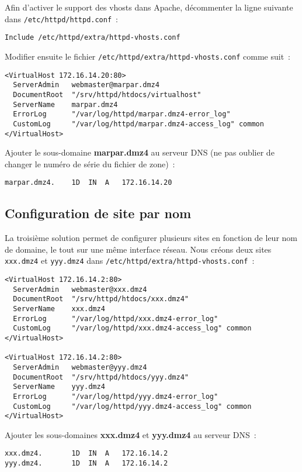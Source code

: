 \documentclass[11pt,a4paper,oneside]{article}
\newcommand{\inlinecode}{\lstinline[breaklines=true]}
\begin{document}
Afin d'activer le support des vhosts dans Apache, décommenter la ligne suivante
dans \inlinecode{/etc/httpd/httpd.conf}~:
\begin{lstlisting}
Include /etc/httpd/extra/httpd-vhosts.conf
\end{lstlisting}

Modifier ensuite le fichier \inlinecode{/etc/httpd/extra/httpd-vhosts.conf} comme
suit~:
\begin{lstlisting}
<VirtualHost 172.16.14.20:80>
  ServerAdmin   webmaster@marpar.dmz4
  DocumentRoot  "/srv/httpd/htdocs/virtualhost"
  ServerName    marpar.dmz4
  ErrorLog      "/var/log/httpd/marpar.dmz4-error_log"
  CustomLog     "/var/log/httpd/marpar.dmz4-access_log" common
</VirtualHost>
\end{lstlisting}

Ajouter le sous-domaine \textbf{marpar.dmz4} au serveur DNS (ne pas oublier de
changer le numéro de série du fichier de zone)~:
\begin{lstlisting}
marpar.dmz4.    1D  IN  A   172.16.14.20
\end{lstlisting}

\subsection{Configuration de site par nom}

La troisième solution permet de configurer plusieurs sites en fonction de leur
nom de domaine, le tout sur une même interface réseau. Nous créons deux sites
\inlinecode{xxx.dmz4} et \inlinecode{yyy.dmz4} dans
\inlinecode{/etc/httpd/extra/httpd-vhosts.conf}~:
\begin{lstlisting}
<VirtualHost 172.16.14.2:80>
  ServerAdmin   webmaster@xxx.dmz4
  DocumentRoot  "/srv/httpd/htdocs/xxx.dmz4"
  ServerName    xxx.dmz4
  ErrorLog      "/var/log/httpd/xxx.dmz4-error_log"
  CustomLog     "/var/log/httpd/xxx.dmz4-access_log" common
</VirtualHost>

<VirtualHost 172.16.14.2:80>
  ServerAdmin   webmaster@yyy.dmz4
  DocumentRoot  "/srv/httpd/htdocs/yyy.dmz4"
  ServerName    yyy.dmz4
  ErrorLog      "/var/log/httpd/yyy.dmz4-error_log"
  CustomLog     "/var/log/httpd/yyy.dmz4-access_log" common
</VirtualHost>
\end{lstlisting}

Ajouter les sous-domaines \textbf{xxx.dmz4} et \textbf{yyy.dmz4} au serveur
DNS~:
\begin{lstlisting}
xxx.dmz4.       1D  IN  A   172.16.14.2
yyy.dmz4.       1D  IN  A   172.16.14.2
\end{lstlisting}
\end{document}
